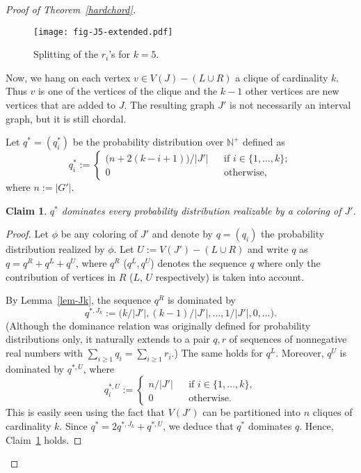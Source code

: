\documentclass[10pt,a4paper]{article}
\newtheorem{claim}{Claim}
\begin{document}
\begin{proof}[Proof of Theorem~\ref{hardchord}]
\begin{figure}
\centering
\texttt{[image: fig-J5-extended.pdf]} 
\caption{\label{fig-J5-extended}Splitting of the $r_{i}$'s for $k=5$.}
\end{figure}

Now, we hang on each vertex $v\in V(J) - (L\cup R)$  
a clique of cardinality $k$. Thus $v$ is one of the vertices of the clique 
and the $k-1$ other vertices are new vertices that are added to $J$.
The resulting graph $J'$ is not necessarily an interval graph, but it 
is still chordal.

Let $q^*=(q^*_{i})$ be the probability distribution over $\mathbb{N}^{+}$ defined as
$$
q^*_{i}:= \left\{
\begin{array}{lll}
\big(n + 2(k-i+1)\big) / |J'| & & \textrm{if } i\in \{1,\dots,k\}; \\
0 & & \textrm{otherwise},
\end{array}
\right.
$$
where $n := |G'|$.

\begin{claim}
\label{claim-hardness-chordal-dominates}
$q^*$ dominates every probability distribution realizable by a coloring of $J'$.
\end{claim}
\begin{proof}
Let $\phi$ be any coloring of $J'$ and denote by $q=(q_{i})$ the probability 
distribution realized by $\phi$. 
Let $U:=V(J') - (L\cup R)$  and write $q$ as $q=q^{R} + q^{L} + 
q^{U}$, where $q^{R}$ ($q^{L},q^{U}$) denotes the sequence $q$ where
only the contribution of vertices in $R$ ($L$, $U$ respectively) is taken into account.

By Lemma~\ref{lem-Jk}, the sequence $q^{R}$ is dominated by 
$$
q^{*, J_{k}} := \big(k/ |J'|, (k-1)/ |J'|, \dots, 1/ |J'|, 0, \dots\big).
$$
(Although the dominance relation was originally defined for probability distributions only, it 
naturally extends to a pair $q,r$ of sequences of
nonnegative real numbers with $\sum_{i\geq 1} q_{i} = \sum_{i\geq 1} r_{i}$.) 
The same holds for $q^{L}$. Moreover, $q^{U}$ is dominated by
$q^{*, U}$, where 
$$
q^{*, U}_{i}:= \left\{
\begin{array}{lll}
n / |J'| & & \textrm{if } i\in \{1,\dots,k\}, \\
0 & & \textrm{otherwise}.
\end{array}
\right.
$$
This is easily seen using the fact that $V(J')$ can be partitioned into $n$ cliques
of cardinality $k$. 
Since $q^{*} =  2q^{*, J_{k}} + q^{*, U}$, we deduce that $q^{*}$
dominates $q$. Hence, Claim~\ref{claim-hardness-chordal-dominates} holds.
\end{proof}


\end{proof}
\end{document}
